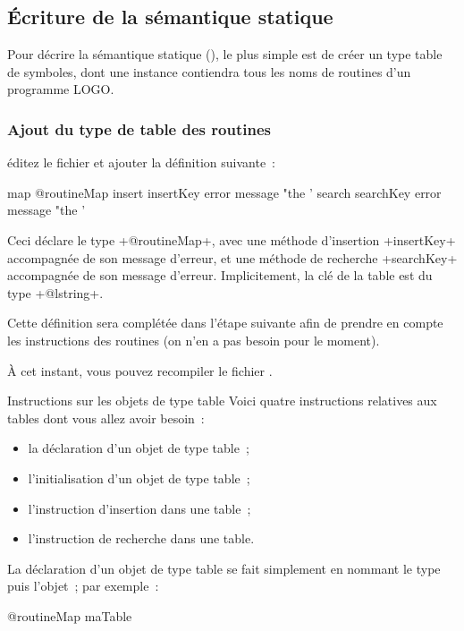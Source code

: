 \subsection{Écriture de la sémantique statique}
Pour décrire la sémantique statique (), le plus simple est de créer un type table de symboles, dont une instance contiendra tous les noms de routines d'un programme LOGO.

\subsubsection{Ajout du type de table des routines}
éditez le fichier  et ajouter la définition suivante~:

\begin{galgas3}
map @routineMap {
  insert insertKey error message "the '%
  search searchKey error message "the '%
}
\end{galgas3}

Ceci déclare le type \ggst+@routineMap+, avec une méthode d'insertion \ggst+insertKey+ accompagnée de son message d'erreur, et une méthode de recherche \ggst+searchKey+ accompagnée de son message d'erreur. Implicitement, la clé de la table est du type \ggst+@lstring+.

Cette définition sera complétée dans l'étape suivante afin de prendre en compte les instructions des routines (on n'en a pas besoin pour le moment).

À cet instant, vous pouvez recompiler le fichier .

Instructions sur les objets de type table
Voici quatre instructions relatives aux tables dont vous allez avoir besoin~:
\begin{itemize}
  \item la déclaration d'un objet de type table~;
  \item l'initialisation d'un objet de type table~;
  \item l'instruction d'insertion dans une table~;
  \item l'instruction de recherche dans une table.
\end{itemize}

La déclaration d'un objet de type table se fait simplement en nommant le type puis l'objet~; par exemple~:
\begin{galgas3}
@routineMap maTable
\end{galgas3}

